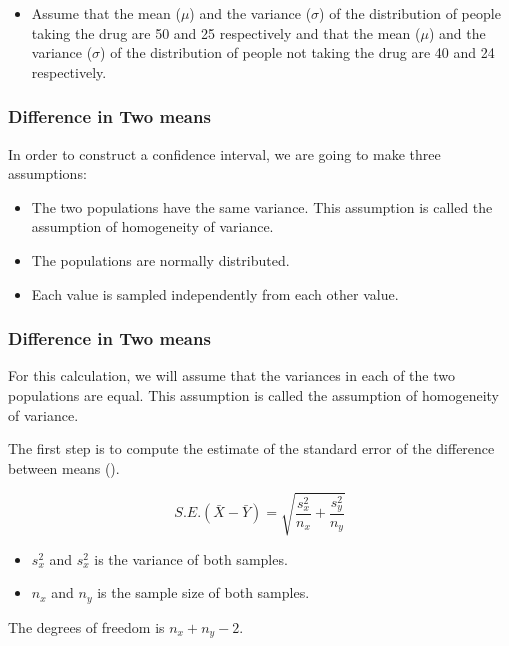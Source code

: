 \begin{frame}\begin{itemize}
\item Assume that the mean ($\mu$) and the variance ($\sigma$) of the distribution 
of people taking the drug are 50 and 25 respectively and that the mean ($\mu$) 
and the variance ($\sigma$) of the distribution of people not taking the drug are 
40 and 24 respectively. 
\end{itemize}
\end{frame}




\begin{frame}
\frametitle{Difference in Two means}
In order to construct a confidence interval, we are going to make three assumptions:

\begin{itemize}
\item The two populations have the same variance. This assumption is called the assumption of homogeneity of variance. 
\item The populations are normally distributed. 
\item Each value is sampled independently from each other value. 
\end{itemize}
\end{frame}
\begin{frame}
\frametitle{Difference in Two means}
For this calculation, we will assume that the variances in each of the two populations are equal. This assumption is called the assumption of homogeneity of variance. 

The first step is to compute the estimate of the standard error of the difference between means (). 

\[ S.E.(\bar{X}-\bar{Y}) = \sqrt{\frac{s^2_x}{n_x} + \frac{s^2_y}{n_y}} \]

\begin{itemize}
\item $s^2_x$ and $s^2_x$ is the variance of both samples.
\item $n_x$ and $n_y$ is the sample size of both samples.
\end{itemize}
The degrees of freedom is $n_x + n_y -2$.
\end{frame}
